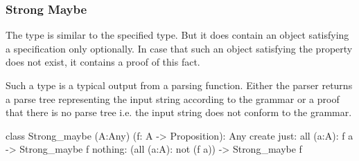 \subsubsection{Strong Maybe}

The type  is similar to the specified type. But it does
contain an object satisfying a specification only optionally. In case that
such an object satisfying the property does not exist, it contains a proof of
this fact.

Such a type is a typical output from a parsing function. Either the parser
returns a parse tree representing the input string according to the grammar or
a proof that there is no parse tree i.e. the input string does not conform to
the grammar.

\begin{alba}
   class
     Strong_maybe (A:Any) (f: A -> Proposition): Any
   create
     just:    all (a:A): f a -> Strong_maybe f
     nothing: (all (a:A): not (f a)) -> Strong_maybe f
\end{alba}




